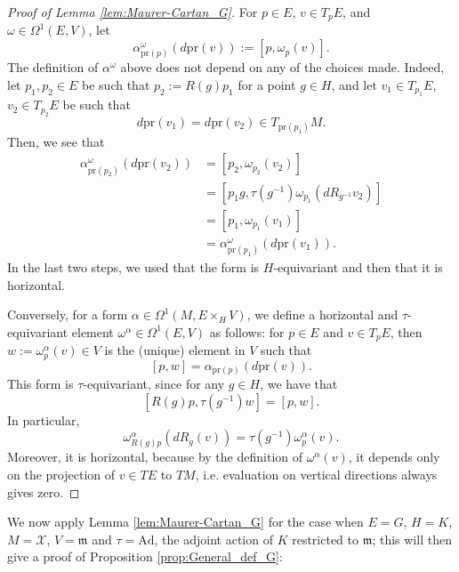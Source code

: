 \documentclass[oneside,11pt]{amsart}
\theoremstyle{definition}
\theoremstyle{remark}
\numberwithin{thm}{section}
\numberwithin{equation}{section}
\begin{document}
\begin{proof}[Proof of Lemma \ref{lem:Maurer-Cartan_G}]
For $p\in E$, $v\in T_pE$, and $\omega\in \Omega^1(E,V)$, let 
\[\alpha^\omega_{\mathrm{pr}(p)}(d\mathrm{pr}(v)):=[p,\omega_p(v)].\] 
The definition of $\alpha^\omega$ above does not depend on any of the choices made. Indeed, let $p_1,p_2\in E$ be such that $p_2:=R(g)p_1$ for a point  $g\in H$, and let $v_1\in T_{p_1}E$, $v_2\in T_{p_2}E$ be such that \[d\mathrm{pr}(v_1)=d\mathrm{pr}(v_2)\in T_{\mathrm{pr}(p_1)}M.\] Then, we see that
\begin{align*}
\alpha^\omega_{\mathrm{pr}(p_2)}(d\mathrm{pr}(v_2)) & = [p_2,\omega_{p_2}(v_2)] \\
& = [p_1g,\tau(g^{-1})\omega_{p_1}(dR_{g^{-1}}v_2)]\\
& = [p_1,\omega_{p_1}(v_1)]\\
& = \alpha^\omega_{\mathrm{pr}(p_1)}(d\mathrm{pr}(v_1)).
\end{align*}
In the last two steps, we used that the form is $H$-equivariant and then that it is horizontal.

Conversely, for a form $\alpha\in \Omega^1(M,E\times_H V)$, we define a horizontal and $\tau$-equivariant element  $\omega^\alpha\in \Omega^1(E,V)$ as follows: for $p\in E$ and $v\in T_pE$, then $w:=\omega^\alpha_p(v) \in V$ is the (unique) element in $V$ such that 
$$[p,w]=\alpha_{\mathrm{pr}(p)}(d\mathrm{pr}(v)).$$
This form is $\tau$-equivariant, since for any $g\in H$, we have that 
\[[R(g)p,\tau(g^{-1})w]=[p,w].\] In particular, 
\[\omega^\alpha_{R(g)p}(dR_g(v))=\tau(g^{-1})\omega^\alpha_p(v).\]
Moreover,  it is horizontal, because by the definition of $\omega^\alpha(v)$, it depends only on the projection of $v\in TE$ to $TM$, i.e. evaluation on vertical directions always gives zero.
\end{proof}

We now apply Lemma \ref{lem:Maurer-Cartan_G} for the case when $E=G$, $H=K$, $M=\mathcal X$, $V=\mathfrak m$ and $\tau=\mathrm{Ad}$, the adjoint action of $K$ restricted to $\mathfrak m$; this will then give a proof of  Proposition \ref{prop:General_def_G}:
\end{document}

